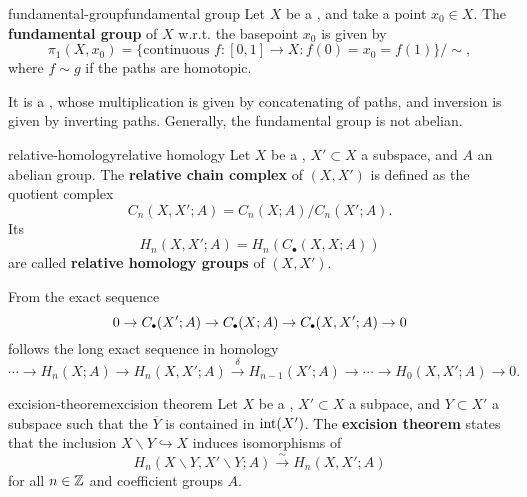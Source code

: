 \begin{topic}{fundamental-group}{fundamental group}
    Let $X$ be a , and take a point $x_0 \in X$. The \textbf{fundamental group} of $X$ w.r.t. the basepoint $x_0$ is given by
    \[ \pi_1(X, x_0) = \{ \text{continuous } f : [0, 1] \to X : f(0) = x_0 = f(1) \} / \sim{} , \]
    where $f \sim{} g$ if the paths are homotopic.
    
    It is a , whose multiplication is given by concatenating of paths, and inversion is given by inverting paths. Generally, the fundamental group is not abelian.
\end{topic}

\begin{topic}{relative-homology}{relative homology}
    Let $X$ be a , $X' \subset X$ a subspace, and $A$ an abelian group. The \textbf{relative chain complex} of $(X, X')$ is defined as the quotient complex
    \[ C_n(X, X'; A) = C_n(X; A) / C_n(X'; A) .  \]
    Its 
    \[ H_n(X, X'; A) = H_n(C_\bullet(X, X; A)) \]
    are called \textbf{relative homology groups} of $(X, X')$.
    
    From the exact sequence
    \[ 0 \to C_\bdot(X'; A) \to C_\bdot(X; A) \to C_\bdot(X, X'; A) \to 0 \]
    follows the long exact sequence in homology
    \[ \cdots \to H_n(X; A) \to H_n(X, X'; A) \xrightarrow{\delta} H_{n - 1}(X'; A) \to \cdots \to H_0(X, X'; A) \to 0 . \]
\end{topic}

\begin{topic}{excision-theorem}{excision theorem}
    Let $X$ be a , $X' \subset X$ a subpace, and $Y \subset X'$ a subspace such that the  $\overline{Y}$ is contained in  $\textup{int}(X')$. The \textbf{excision theorem} states that the inclusion $X \backslash Y \hookrightarrow X$ induces isomorphisms of 
    \[ H_n(X \backslash Y, X' \backslash Y; A) \xrightarrow{\sim} H_n(X, X'; A) \]
    for all $n \in \mathbb{Z}$ and coefficient groups $A$.
\end{topic}

